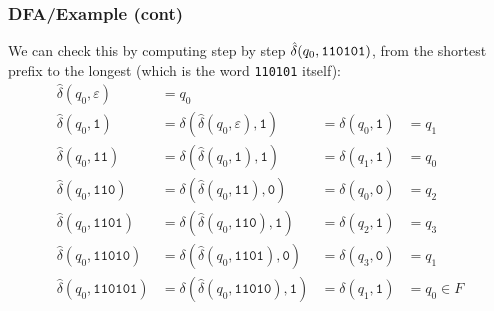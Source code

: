%
\begin{frame}[containsverbatim]
\frametitle{DFA/Example (cont)}

We can check this by computing step by step
\(\hat{\delta}(q_0,\verb+110101+)\), from the shortest prefix to the
longest (which is the word \verb+110101+ itself):
\begin{align*}
  \hat{\delta} (q_0, \varepsilon)
&= q_0\\
   \hat{\delta} (q_0, \texttt{1})
&= \delta (\hat{\delta} (q_0, \varepsilon), \texttt{1})
&= \delta (q_0, \texttt{1})
&= q_1\\
   \hat{\delta} (q_0, \texttt{11})
&= \delta (\hat{\delta} (q_0, \texttt{1}), \texttt{1})
&= \delta (q_1, \texttt{1})
&= q_0\\
   \hat{\delta} (q_0, \texttt{110})
&= \delta (\hat{\delta} (q_0, \texttt{11}), \texttt{0})
&= \delta (q_0, \texttt{0})
&= q_2\\
   \hat{\delta} (q_0, \texttt{1101})
&= \delta (\hat{\delta} (q_0, \texttt{110}), \texttt{1})
&= \delta (q_2, \texttt{1})
&= q_3\\
   \hat{\delta} (q_0, \texttt{11010})
&= \delta (\hat{\delta} (q_0, \texttt{1101}), \texttt{0})
&= \delta (q_3, \texttt{0})
&= q_1\\
   \hat{\delta} (q_0, \texttt{110101})
&= \delta (\hat{\delta} (q_0, \texttt{11010}), \texttt{1})
&= \delta (q_1, \texttt{1})
&= q_0 \in F
\end{align*}

\end{frame}

